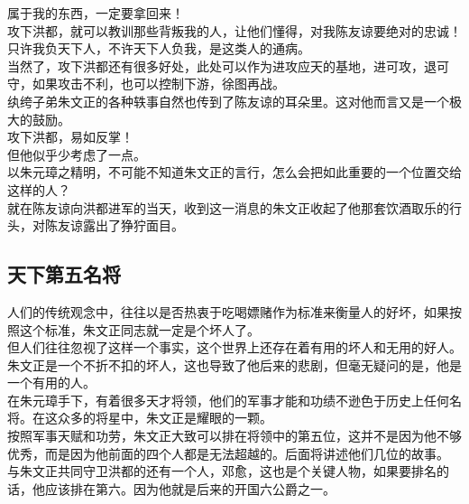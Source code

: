 \begin{multicols}{\theparacolNo}
属于我的东西，一定要拿回来！\\

攻下洪都，就可以教训那些背叛我的人，让他们懂得，对我陈友谅要绝对的忠诚！\\

只许我负天下人，不许天下人负我，是这类人的通病。\\

当然了，攻下洪都还有很多好处，此处可以作为进攻应天的基地，进可攻，退可守，如果攻击不利，也可以控制下游，徐图再战。\\

纨绔子弟朱文正的各种轶事自然也传到了陈友谅的耳朵里。这对他而言又是一个极大的鼓励。\\

攻下洪都，易如反掌！\\

但他似乎少考虑了一点。\\

以朱元璋之精明，不可能不知道朱文正的言行，怎么会把如此重要的一个位置交给这样的人？\\

就在陈友谅向洪都进军的当天，收到这一消息的朱文正收起了他那套饮酒取乐的行头，对陈友谅露出了狰狞面目。\\

\subsection{天下第五名将}
人们的传统观念中，往往以是否热衷于吃喝嫖赌作为标准来衡量人的好坏，如果按照这个标准，朱文正同志就一定是个坏人了。\\

但人们往往忽视了这样一个事实，这个世界上还存在着有用的坏人和无用的好人。\\

朱文正是一个不折不扣的坏人，这也导致了他后来的悲剧，但毫无疑问的是，他是一个有用的人。\\

在朱元璋手下，有着很多天才将领，他们的军事才能和功绩不逊色于历史上任何名将。在这众多的将星中，朱文正是耀眼的一颗。\\

按照军事天赋和功劳，朱文正大致可以排在将领中的第五位，这并不是因为他不够优秀，而是因为他前面的四个人都是无法超越的。后面将讲述他们几位的故事。\\

与朱文正共同守卫洪都的还有一个人，邓愈，这也是个关键人物，如果要排名的话，他应该排在第六。因为他就是后来的开国六公爵之一。\\


\end{multicols}
